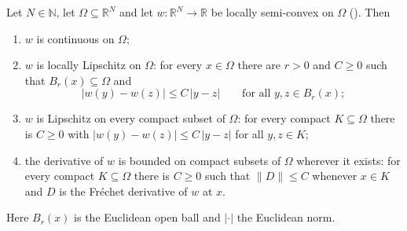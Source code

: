 \begin{theorem}
Let $N\in\mathbb N$, let $\Omega\subseteq\mathbb R^{N}$ and let
$w:\mathbb R^{N}\to\mathbb R$ be locally semi-convex on $\Omega$
(). Then
\begin{enumerate}
\item $w$ is continuous on $\Omega$;
\item $w$ is locally Lipschitz on $\Omega$: for every $x\in\Omega$ there are $r>0$ and
  $C\ge0$ such that $B_r(x)\subseteq\Omega$ and
  \[
   |w(y)-w(z)|\le C\,|y-z|\qquad\text{for all }y,z\in B_r(x);
  \]
\item $w$ is Lipschitz on every compact subset of $\Omega$: for every compact
  $K\subseteq\Omega$ there is $C\ge0$ with $|w(y)-w(z)|\le C\,|y-z|$ for all $y,z\in K$;
\item the derivative of $w$ is bounded on compact subsets of $\Omega$ wherever it exists:
  for every compact $K\subseteq\Omega$ there is $C\ge0$ such that $\|D\|\le C$ whenever
  $x\in K$ and $D$ is the Fr\'echet derivative of $w$ at $x$.
\end{enumerate}
Here $B_r(x)$ is the Euclidean open ball and $|\cdot|$ the Euclidean norm.
\end{theorem}
